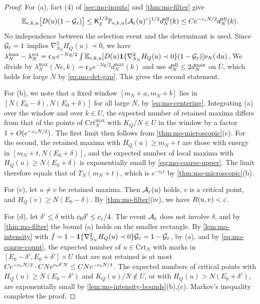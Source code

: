 \begin{proof}
For (a), fact (4) of \cref{sec:mo-inputs} and \cref{thm:mo-filter} give
\[
\mathbb E_{e,k,u}\bigl[D(u)(1-\mathcal G_\varepsilon)\bigr]\le\mathsf K_2^{1/2}\mathbb P_{e,k,u}(\mathcal A_\varepsilon(u)^c)^{1/2}d_N^{\rm all}(k)\le Ce^{-c_\varepsilon N/2}d_N^{\rm all}(k).
\]
No independence between the selection event and the determinant is used. Since $\mathcal G_\varepsilon=1$ implies $\nabla_{S_N}^2H_Q(u)\prec0$, we have $\lambda_N^{\max}-\lambda_N^{\rm ret}=\mathfrak c_Ne^{-Nq/2}\int\mathbb E_{e,k,u}[D(u)\mathbf 1\{\nabla_{S_N}^2H_Q(u)\prec0\}(1-\mathcal G_\varepsilon)]\nu_N(\,\mathrm d u)$. We divide by $\lambda_N^{\max}(Ne,k)=\mathfrak c_Ne^{-Nq/2}d_N^{\max}(k)$ and use $d_N^{\rm all}\le2d_N^{\max}$ on $\overline U$, which holds for large $N$ by \eqref{eq:mo-det-gap}. This gives the second statement.

For (b), we note that a fixed window $[m_N+a,m_N+b]$ lies in $[N(E_0-\delta),N(E_0+\delta)]$ for all large $N$, by \eqref{eq:mo-centering}. Integrating (a) over the window and over $k\in U$, the expected number of retained maxima differs from that of the points of $\mathrm{Crt}_N^{\max}$ with $K_Q/N\in U$ in the window by a factor $1+O(e^{-c_\varepsilon N/2})$. The first limit then follows from \cref{thm:mo-microscopic}(c). For the second, the retained maxima with $H_Q(u)\ge m_N+t$ are those with energy in $[m_N+t,N(E_0+\delta)]$, and the expected number of local maxima with $H_Q(u)\ge N(E_0+\delta)$ is exponentially small by \eqref{eq:mo-coarse-upper}. The limit therefore equals that of $T_N(m_N+t)$, which is $e^{-c_0t}$ by \cref{thm:mo-microscopic}(b).

For (c), let $u\ne v$ be retained maxima. Then $\mathcal A_\varepsilon(u)$ holds, $v$ is a critical point, and $H_Q(v)\ge N(E_0-\delta)$. By \cref{thm:mo-filter}(iv), we have $R(u,v)<\varepsilon$.

For (d), let $\delta'\le\delta$ with $c_0\delta'\le c_\varepsilon/4$. The event $\mathcal A_\varepsilon$ does not involve $\delta$, and by \cref{thm:mo-filter} the bound (a) holds on the smaller rectangle. By \cref{lem:mo-intensity} with $f=1-\mathbf 1\{\nabla_{S_N}^2H_Q(u)\prec0\}\mathcal G_\varepsilon=1-\mathcal G_\varepsilon$, by (a), and by \eqref{eq:mo-coarse-count}, the expected number of $u\in\mathrm{Crt}_N$ with marks in $[E_0-\delta',E_0+\delta']\times U$ that are not retained is at most $Ce^{-c_\varepsilon N/2}\cdot CNe^{c_0\delta'N}\le CNe^{-c_\varepsilon N/4}$. The expected numbers of critical points with $H_Q(u)\ge N(E_0-\delta')$ and $K_Q(u)/N\notin U$, or with $H_Q(u)>N(E_0+\delta')$, are exponentially small by \cref{lem:mo-intensity-bounds}(b),(c). Markov's inequality completes the proof.
\end{proof}


